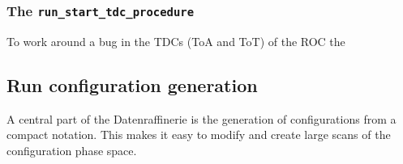 \documentclass[11pt]{article}
\begin{document}
\subsubsection{The \texttt{run\_start\_tdc\_procedure}}\label{sec:start_tdc_proc}
To work around a bug in the TDCs (ToA and ToT) of the ROC the 
\subsection{Run configuration generation}\label{sec:run_config}
A central part of the Datenraffinerie is the generation of configurations from a compact notation. This makes it easy to modify and create large scans of the configuration phase space.
\end{document}
